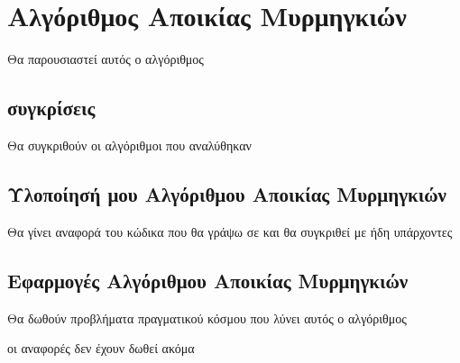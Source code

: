 \section{Αλγόριθμος Αποικίας Μυρμηγκιών}
Θα παρουσιαστεί αυτός ο αλγόριθμος
\subsection{συγκρίσεις}
Θα συγκριθούν οι αλγόριθμοι που αναλύθηκαν 
\subsection{Υλοποίησή μου Αλγόριθμου Αποικίας Μυρμηγκιών}
Θα γίνει αναφορά του κώδικα που θα γράψω σε  και θα συγκριθεί με ήδη υπάρχοντες
\subsection{Εφαρμογές Αλγόριθμου Αποικίας Μυρμηγκιών}
Θα δωθούν  προβλήματα πραγματικού κόσμου που λύνει αυτός ο αλγόριθμος

οι αναφορές δεν έχουν δωθεί ακόμα